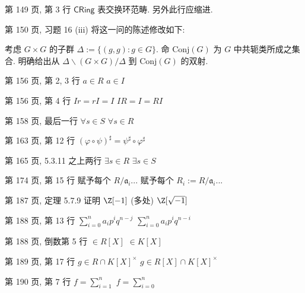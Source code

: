 \documentclass{AJerrata}
\begin{document}
\begin{Errata}
		\item[第 149 页, 第 3 行]
		$\mathsf{CRing}$ 表交换环范畴. 另外此行应缩进.
		
		\item[第 150 页, 习题 16 (iii)]
		将这一问的陈述修改如下:
		
		考虑 $G \times G$ 的子群 $\Delta := \{(g,g) : g \in G \}$. 命 $\text{Conj}(G)$ 为 $G$ 中共轭类所成之集合. 明确给出从 $\Delta \backslash (G \times G) /\Delta$ 到 $\text{Conj}(G)$ 的双射.
		
		
		\item[第 156 页, 第 2, 3 行]
		\Orig $a \in R$
		\Corr $a \in I$
		
		\item[第 156 页, 第 4 行]
		\Orig $Ir = rI = I$
		\Corr $IR = I = RI$

		\item[第 158 页, 最后一行]
		\Orig $\forall s \in S$
		\Corr $\forall s \in R$
		
		\item[第 163 页, 第 12 行]
		\Corr $(\varphi \circ \psi)^\sharp = \psi^\sharp \circ \varphi^\sharp$
		
		\item[第 165 页, 5.3.11 之上两行]
		\Orig $\exists s \in R$
		\Corr $\exists s \in S$
		
		\item[第 174 页, 第 15 行]
		\Orig 赋予每个 $R/\mathfrak{a}_i$...
		\Corr 赋予每个 $R_i := R/\mathfrak{a}_i$...

		\item[第 187 页, 定理 5.7.9 证明]
		\Orig $\Z[-1]$ (多处)
		\Corr $\Z[\sqrt{-1}]$

		\item[第 188 页, 第 13 行]
		\Orig $\sum_{i=0}^n a_i p^i q^{n-j}$
		\Corr $\sum_{i=0}^n a_i p^i q^{n-i}$

		\item[第 188 页, 倒数第 5 行]
		\Orig $\in R[X]$
		\Corr $\in K[X]$
		
		\item[第 189 页, 第 17 行]
		\Orig $g \in R \cap K[X]^\times$
		\Corr $g \in R[X] \cap K[X]^\times$
		
		\item[第 190 页, 第 7 行]
		\Orig $f = \sum_{i=1}^n$
		\Corr $f = \sum_{i=0}^n$
		

\end{Errata}
\end{document}
